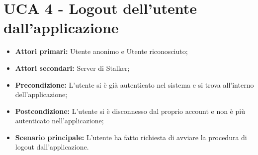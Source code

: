 \newpage
\section{UCA 4 - Logout dell'utente dall'applicazione}%
\begin{itemize}
\item \textbf{Attori primari:} Utente anonimo e Utente riconosciuto;
\item \textbf{Attori secondari:} Server di Stalker;
\item \textbf{Precondizione:} L’utente si è già autenticato nel sistema e si trova all’interno dell’applicazione;
\item \textbf{Postcondizione:}  L’utente si è disconnesso dal proprio account e non è più autenticato nell’applicazione;
\item \textbf{Scenario principale:} L'utente ha fatto richiesta di avviare la procedura di logout dall'applicazione.
\end{itemize}